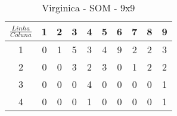 \begin{table}[]
\centering
\caption{Virginica - SOM - 9x9}
\label{my-label}
\begin{tabular}{|c|ccccccccc|}
\hline
\rowcolor[HTML]{FFFFFF} 
$\frac{Linha}{Coluna}$    & \multicolumn{1}{c|}{\cellcolor[HTML]{FFFFFF}1} & \multicolumn{1}{c|}{\cellcolor[HTML]{FFFFFF}2} & \multicolumn{1}{c|}{\cellcolor[HTML]{FFFFFF}3} & \multicolumn{1}{c|}{\cellcolor[HTML]{FFFFFF}4} & \multicolumn{1}{c|}{\cellcolor[HTML]{FFFFFF}5} & \multicolumn{1}{c|}{\cellcolor[HTML]{FFFFFF}6} & \multicolumn{1}{c|}{\cellcolor[HTML]{FFFFFF}7} & \multicolumn{1}{c|}{\cellcolor[HTML]{FFFFFF}8} & 9                         \\ \hline
\rowcolor[HTML]{34CDF9} 
\cellcolor[HTML]{FFFFFF}1 & \cellcolor[HTML]{FFFFFF}0                      & 1                                              & 5                                              & 3                                              & 4                                              & 9                                              & 2                                              & 2                                              & 3                         \\ \cline{1-1}
\rowcolor[HTML]{34CDF9} 
\cellcolor[HTML]{FFFFFF}2 & \cellcolor[HTML]{FFFFFF}0                      & \cellcolor[HTML]{FFFFFF}0                      & 3                                              & 2                                              & 3                                              & \cellcolor[HTML]{FFFFFF}0                      & 1                                              & 2                                              & 2                         \\ \cline{1-1}
\rowcolor[HTML]{FFFFFF} 
3                         & 0                                              & 0                                              & 0                                              & \cellcolor[HTML]{34CDF9}4                      & 0                                              & 0                                              & 0                                              & 0                                              & \cellcolor[HTML]{34CDF9}1 \\ \cline{1-1}
\rowcolor[HTML]{FFFFFF} 
4                         & 0                                              & 0                                              & 0                                              & \cellcolor[HTML]{34CDF9}1                      & 0                                              & 0                                              & 0                                              & 0                                              & \cellcolor[HTML]{34CDF9}1 \\ \cline{1-1}

\end{tabular}
\end{table}
